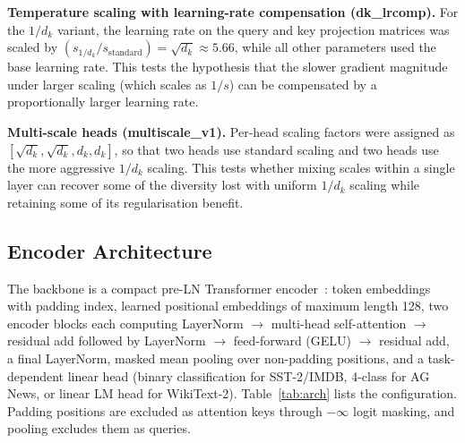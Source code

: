 \documentclass[10pt,a4paper]{article}
\begin{document}
\textbf{Temperature scaling with learning-rate compensation (dk\_lrcomp).}
For the $1/d_k$ variant, the learning rate on the query and key projection matrices was scaled by $(s_{1/d_k} / s_{\text{standard}}) = \sqrt{d_k} \approx 5.66$, while all other parameters used the base learning rate. This tests the hypothesis that the slower gradient magnitude under larger scaling (which scales as $1/s$) can be compensated by a proportionally larger learning rate.

\textbf{Multi-scale heads (multiscale\_v1).}
Per-head scaling factors were assigned as $[\sqrt{d_k}, \sqrt{d_k}, d_k, d_k]$, so that two heads use standard scaling and two heads use the more aggressive $1/d_k$ scaling. This tests whether mixing scales within a single layer can recover some of the diversity lost with uniform $1/d_k$ scaling while retaining some of its regularisation benefit.

\subsection{Encoder Architecture}

The backbone is a compact pre-LN Transformer encoder~\cite{xiong2020}: token embeddings with padding index, learned positional embeddings of maximum length 128, two encoder blocks each computing LayerNorm $\rightarrow$ multi-head self-attention $\rightarrow$ residual add followed by LayerNorm $\rightarrow$ feed-forward (GELU) $\rightarrow$ residual add, a final LayerNorm, masked mean pooling over non-padding positions, and a task-dependent linear head (binary classification for SST-2/IMDB, 4-class for AG News, or linear LM head for WikiText-2). Table~\ref{tab:arch} lists the configuration. Padding positions are excluded as attention keys through $-\infty$ logit masking, and pooling excludes them as queries.
\end{document}
